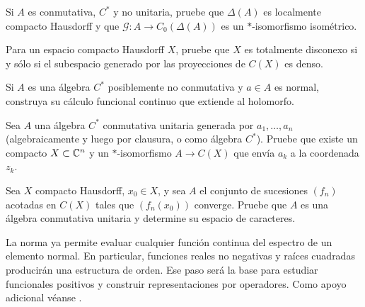\begin{ejercicio}\label{ej:v3-l26-2}
Si $A$ es conmutativa, $C^*$ y no unitaria, pruebe que $\Delta(A)$ es localmente compacto Hausdorff y que $\mathcal G:A\to C_0(\Delta(A))$ es un $*$-isomorfismo isométrico.
\end{ejercicio}


\begin{ejercicio}\label{ej:v3-l26-3}
Para un espacio compacto Hausdorff $X$, pruebe que $X$ es totalmente disconexo si y sólo si el subespacio generado por las proyecciones de $C(X)$ es denso.
\end{ejercicio}


\begin{ejercicio}\label{ej:v3-l26-4}
Si $A$ es una álgebra $C^*$ posiblemente no conmutativa y $a\in A$ es normal, construya su cálculo funcional continuo que extiende al holomorfo.
\end{ejercicio}


\begin{ejercicio}\label{ej:v3-l26-5}
Sea $A$ una álgebra $C^*$ conmutativa unitaria generada por $a_1,\ldots,a_n$ (algebraicamente y luego por clausura, o como álgebra $C^*$). Pruebe que existe un compacto $X\subset\mathbb C^n$ y un $*$-isomorfismo $A\to C(X)$ que envía $a_k$ a la coordenada $z_k$.
\end{ejercicio}


\begin{ejercicio}\label{ej:v3-l26-6}
Sea $X$ compacto Hausdorff, $x_0\in X$, y sea $A$ el conjunto de sucesiones $(f_n)$ acotadas en $C(X)$ tales que $(f_n(x_0))$ converge. Pruebe que $A$ es una álgebra conmutativa unitaria y determine su espacio de caracteres.
\end{ejercicio}


La norma ya permite evaluar cualquier función continua del espectro de un elemento normal. En particular, funciones reales no negativas y raíces cuadradas producirán una estructura de orden. Ese paso será la base para estudiar funcionales positivos y construir representaciones por operadores. Como apoyo adicional véanse \cite{maxcstar,maxcalculo,murphy1990,zhu1993}.
